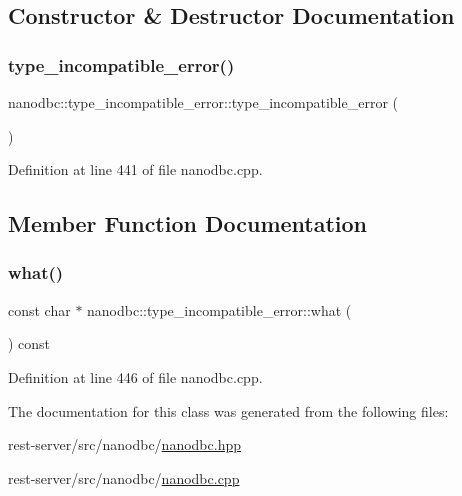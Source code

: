 \subsection{Constructor \& Destructor Documentation}
\mbox{\label{classnanodbc_1_1type__incompatible__error_a3d4a2648703bb661fe4043d165f0b21a}} 
\subsubsection{\texorpdfstring{type\_incompatible\_error()}{type\_incompatible\_error()}}
{\footnotesize\ttfamily nanodbc\+::type\+\_\+incompatible\+\_\+error\+::type\+\_\+incompatible\+\_\+error (\begin{DoxyParamCaption}{ }\end{DoxyParamCaption})}



Definition at line 441 of file nanodbc.\+cpp.



\subsection{Member Function Documentation}
\mbox{\label{classnanodbc_1_1type__incompatible__error_ab5467c27a248427c0b292bd6e4a5769d}} 
\subsubsection{\texorpdfstring{what()}{what()}}
{\footnotesize\ttfamily const char $\ast$ nanodbc\+::type\+\_\+incompatible\+\_\+error\+::what (\begin{DoxyParamCaption}{ }\end{DoxyParamCaption}) const\hspace{0.3cm}{\ttfamily [noexcept]}}



Definition at line 446 of file nanodbc.\+cpp.



The documentation for this class was generated from the following files\+:\begin{DoxyCompactItemize}
\item 
rest-\/server/src/nanodbc/\mbox{\hyperlink{nanodbc_8hpp}{nanodbc.\+hpp}}\item 
rest-\/server/src/nanodbc/\mbox{\hyperlink{nanodbc_8cpp}{nanodbc.\+cpp}}\end{DoxyCompactItemize}

